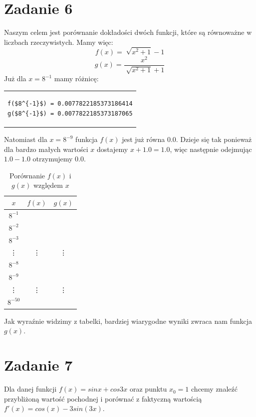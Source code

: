 \documentclass{article}
\begin{document}
\section*{Zadanie 6}
Naszym celem jest porównanie dokładości dwóch funkcji, które są równoważne w
liczbach rzeczywistych. Mamy więc:
\[
f(x) = \sqrt[]{x^2+1}-1
\]
\[
g(x) = \frac{x^2}{\sqrt[]{x^2+1}+1}
\]
Już dla $x = 8^{-1}$ mamy różnicę:
\begin{center}
\begin{tabular}{c}
\begin{lstlisting}[mathescape=true]
f($8^{-1}$) = 0.0077822185373186414
g($8^{-1}$) = 0.0077822185373187065
\end{lstlisting}
\end{tabular}
\end{center}
Natomiast dla $x = 8^{-9}$ funkcja $f(x)$ jest już równa $0.0$.
Dzieje się tak ponieważ dla bardzo małych wartości $x$ dostajemy $x + 1.0 = 1.0$,
więc następnie odejmując $1.0 - 1.0$ otrzymujemy $0.0$.
\begin{table}[H]
  \centering
  \begin{tabular}{c S[table-format=1.15] S[table-format=1.15]}
  \toprule
  $x$ & {$f(x)$} & {$g(x)$} \\
  \midrule
  $8^{-1}$ &  &  \\
  $8^{-2}$ &  &  \\
  $8^{-3}$ &  &  \\
  \vdots & \vdots & \vdots \\
  $8^{-8}$ &  &  \\
  $8^{-9}$ &  &  \\
  \vdots & \vdots & \vdots \\
  $8^{-50}$ &  &  \\
  \bottomrule
  \end{tabular}
  \caption{Porównanie $f(x)$ i $g(x)$ względem $x$}
  \end{table}
Jak wyraźnie widzimy z tabelki, bardziej wiarygodne wyniki zwraca
nam funkcja $g(x)$.


\section*{Zadanie 7}
Dla danej funkcji $f(x) = sin x + cos 3x$ oraz punktu $x_0 = 1$ chcemy
znaleźć przybliżoną wartość pochodnej i porównać z faktyczną wartością
$f'(x) = cos(x) - 3sin(3x)$. 
\end{document}
